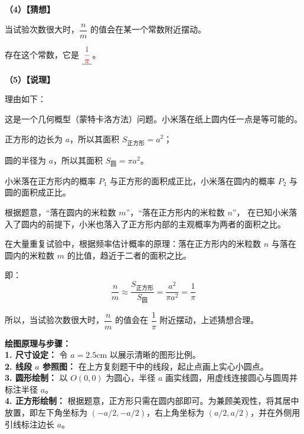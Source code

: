\vspace{0.3cm}
\textbf{（4）【猜想】}

当试验次数很大时，$\dfrac{n}{m}$ 的值会在某一个常数附近摆动。

存在这个常数，它是 $\underline{\textcolor{red}{\,\dfrac{1}{\pi}\,}}$。

\vspace{0.3cm}
\textbf{（5）【说理】}

理由如下：

这是一个几何概型（蒙特卡洛方法）问题。小米落在纸上圆内任一点是等可能的。

正方形的边长为 $a$，所以其面积 $S_{\text{正方形}} = a^2$；

圆的半径为 $a$，所以其面积 $S_{\text{圆}} = \pi a^2$。

小米落在正方形内的概率 $P_1$ 与正方形的面积成正比，小米落在圆内的概率 $P_2$ 与圆的面积成正比。

根据题意，“落在圆内的米粒数 $m$”，“落在正方形内的米粒数 $n$”，
在已知小米落入了圆内的前提下，小米也落入了正方形内部的主观概率为两者的面积之比。

在大量重复试验中，根据频率估计概率的原理：落在正方形内的米粒数 $n$ 与落在圆内的米粒数 $m$ 的比值，趋近于二者的面积之比。

即：
$$\frac{n}{m} \approx \frac{S_{\text{正方形}}}{S_{\text{圆}}} = \frac{a^2}{\pi a^2} = \frac{1}{\pi}$$

所以，当试验次数很大时，$\dfrac{n}{m}$ 的值会在 $\dfrac{1}{\pi}$ 附近摆动，上述猜想合理。

\vspace{0.4cm}
{\small\color{blue!70!black}
\textbf{绘图原理与步骤：}\\
\textbf{1. 尺寸设定：} 令 $a = 2.5$cm 以展示清晰的图形比例。\\
\textbf{2. 线段 $a$ 参照图：} 在上方复刻题干中的线段，起止点画上实心小圆点。\\
\textbf{3. 圆形绘制：} 以 $O(0,0)$ 为圆心，半径 $a$ 画实线圆，用虚线连接圆心与圆周并标注半径 $a$。\\
\textbf{4. 正方形绘制：} 根据题意，正方形只需在圆内部即可。为兼顾美观性，将其居中放置，即左下角坐标为 $(-a/2, -a/2)$，右上角坐标为 $(a/2, a/2)$，并在外侧用引线标注边长 $a$。
}

\newpage

